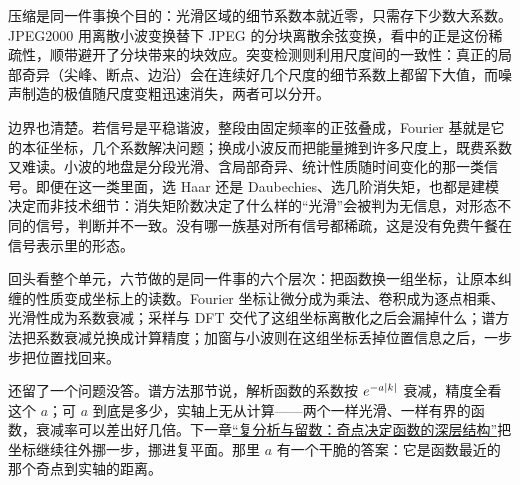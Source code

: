 压缩是同一件事换个目的：光滑区域的细节系数本就近零，只需存下少数大系数。JPEG2000 用离散小波变换替下 JPEG 的分块离散余弦变换，看中的正是这份稀疏性，顺带避开了分块带来的块效应。突变检测则利用尺度间的一致性：真正的局部奇异（尖峰、断点、边沿）会在连续好几个尺度的细节系数上都留下大值，而噪声制造的极值随尺度变粗迅速消失，两者可以分开。

边界也清楚。若信号是平稳谐波，整段由固定频率的正弦叠成，Fourier 基就是它的本征坐标，几个系数解决问题；换成小波反而把能量摊到许多尺度上，既费系数又难读。小波的地盘是分段光滑、含局部奇异、统计性质随时间变化的那一类信号。即便在这一类里面，选 Haar 还是 Daubechies、选几阶消失矩，也都是建模决定而非技术细节：消失矩阶数决定了什么样的``光滑''会被判为无信息，对形态不同的信号，判断并不一致。没有哪一族基对所有信号都稀疏，这是没有免费午餐在信号表示里的形态。

回头看整个单元，六节做的是同一件事的六个层次：把函数换一组坐标，让原本纠缠的性质变成坐标上的读数。Fourier 坐标让微分成为乘法、卷积成为逐点相乘、光滑性成为系数衰减；采样与 DFT 交代了这组坐标离散化之后会漏掉什么；谱方法把系数衰减兑换成计算精度；加窗与小波则在这组坐标丢掉位置信息之后，一步步把位置找回来。

还留了一个问题没答。谱方法那节说，解析函数的系数按 \(e^{-a\left|k\right|}\) 衰减，精度全看这个 \(a\)；可 \(a\) 到底是多少，实轴上无从计算——两个一样光滑、一样有界的函数，衰减率可以差出好几倍。下一章\hyperref[ch:069]{``复分析与留数：奇点决定函数的深层结构''}把坐标继续往外挪一步，挪进复平面。那里 \(a\) 有一个干脆的答案：它是函数最近的那个奇点到实轴的距离。
